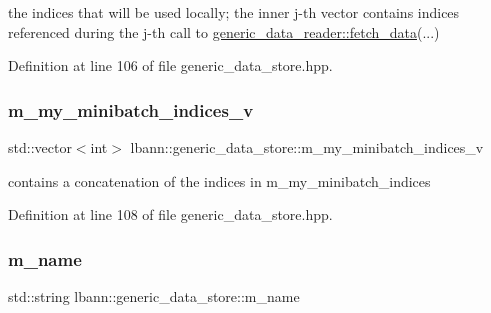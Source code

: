 the indices that will be used locally; the inner j-\/th vector contains indices referenced during the j-\/th call to \hyperlink{classlbann_1_1generic__data__reader_a46b658ba4f6b746632b683568ab76f77}{generic\+\_\+data\+\_\+reader\+::fetch\+\_\+data}(...) 

Definition at line 106 of file generic\+\_\+data\+\_\+store.\+hpp.

\mbox{\label{classlbann_1_1generic__data__store_a41f7fec1f1f3d6568a5765be7a6784eb}} 
\subsubsection{\texorpdfstring{m\+\_\+my\+\_\+minibatch\+\_\+indices\+\_\+v}{m\_my\_minibatch\_indices\_v}}
{\footnotesize\ttfamily std\+::vector$<$int$>$ lbann\+::generic\+\_\+data\+\_\+store\+::m\+\_\+my\+\_\+minibatch\+\_\+indices\+\_\+v\hspace{0.3cm}{\ttfamily [protected]}}



contains a concatenation of the indices in m\+\_\+my\+\_\+minibatch\+\_\+indices 



Definition at line 108 of file generic\+\_\+data\+\_\+store.\+hpp.

\mbox{\label{classlbann_1_1generic__data__store_ad2c2e241eefc6ff972169d757f8d2499}} 
\subsubsection{\texorpdfstring{m\+\_\+name}{m\_name}}
{\footnotesize\ttfamily std\+::string lbann\+::generic\+\_\+data\+\_\+store\+::m\+\_\+name\hspace{0.3cm}{\ttfamily [protected]}}



